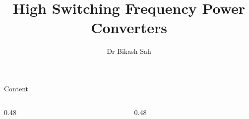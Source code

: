 \documentclass{../course_template/lectureClass}
\title[High switching frequency power converters]{High Switching Frequency Power Converters}
\author{Dr Bikash Sah}
\date{}
\begin{document}

\begin{frame}[plain]
	\titlepage
\end{frame}

\begin{frame}{Content}
	\small
	\begin{columns}[T]
		\begin{column}{0.48\textwidth}
			\tableofcontents[sections={1-8},hideallsubsections]
		\end{column}
		\begin{column}{0.48\textwidth}
			\tableofcontents[sections={9-15},hideallsubsections]
		\end{column}
	\end{columns}
\end{frame}


\end{document}
